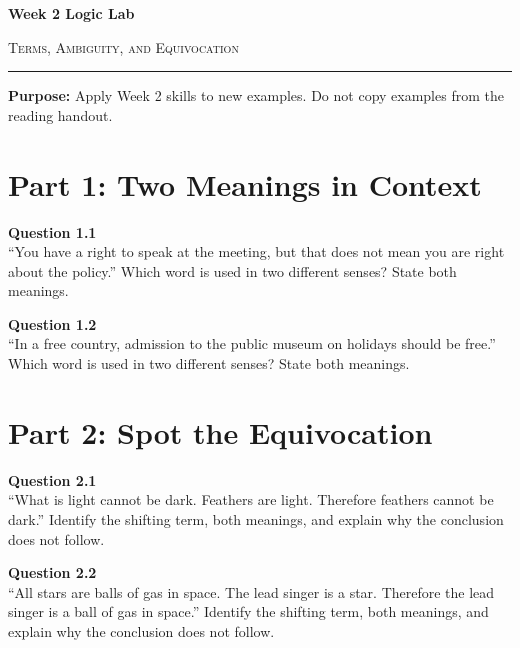 \documentclass[12pt]{article}
\begin{document}
\begin{center}
{\LARGE\bfseries Week 2 Logic Lab}\par\vspace{0.05em}
{\large\scshape Terms, Ambiguity, and Equivocation}\par\vspace{0.1em}
\rule{0.78\textwidth}{0.5pt}\par\vspace{0.15em}
\end{center}

\noindent\textbf{Purpose:} Apply Week 2 skills to new examples. Do not copy examples from the reading handout.

\vspace{0.3em}

\section*{Part 1: Two Meanings in Context}

\textbf{Question 1.1}\\[-0.15em]
``You have a right to speak at the meeting, but that does not mean you are right about the policy.'' Which word is used in two different senses? State both meanings.


\textbf{Question 1.2}\\[-0.15em]
``In a free country, admission to the public museum on holidays should be free.'' Which word is used in two different senses? State both meanings.


\newpage

\section*{Part 2: Spot the Equivocation}

\textbf{Question 2.1}\\[-0.15em]
``What is light cannot be dark. Feathers are light. Therefore feathers cannot be dark.'' Identify the shifting term, both meanings, and explain why the conclusion does not follow.


\textbf{Question 2.2}\\[-0.15em]
``All stars are balls of gas in space. The lead singer is a star. Therefore the lead singer is a ball of gas in space.'' Identify the shifting term, both meanings, and explain why the conclusion does not follow.
\end{document}
